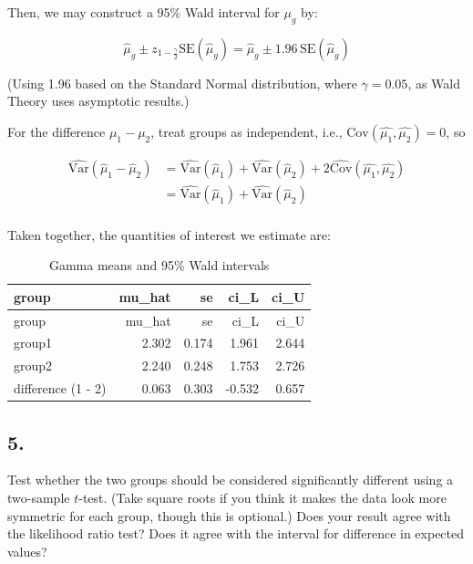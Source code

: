 \documentclass[
]{article}
\begin{document}
Then, we may construct a 95\% Wald interval for \(\mu_g\) by:

\[
\hat\mu_g \pm z_{1 - \frac{\gamma}{2}} \mathrm{SE}(\hat\mu_g)
= \hat\mu_g \pm 1.96\,\mathrm{SE}(\hat\mu_g)
\]

(Using 1.96 based on the Standard Normal distribution, where
\(\gamma = 0.05\), as Wald Theory uses asymptotic results.)

\newpage

For the difference \(\mu_1-\mu_2\), treat groups as independent, i.e.,
\(\mathrm{Cov}(\hat{\mu_1}, \hat{\mu_2}) = 0\), so

\[
\begin{aligned}
\widehat{\mathrm{Var}}(\hat\mu_1-\hat\mu_2)
&= \widehat{\mathrm{Var}}(\hat\mu_1)+\widehat{\mathrm{Var}}(\hat\mu_2) + 2\widehat{\mathrm{Cov}}(\hat{\mu_1}, \hat{\mu_2})\\
&= \widehat{\mathrm{Var}}(\hat\mu_1)+\widehat{\mathrm{Var}}(\hat\mu_2) \\ 
\end{aligned}
\]

Taken together, the quantities of interest we estimate are:

\begin{longtable}[]{@{}lrrrr@{}}
\caption{Gamma means and 95\% Wald intervals}\tabularnewline
\toprule\noalign{}
group & mu\_hat & se & ci\_L & ci\_U \\
\midrule\noalign{}
\endfirsthead
\toprule\noalign{}
group & mu\_hat & se & ci\_L & ci\_U \\
\midrule\noalign{}
\endhead
\bottomrule\noalign{}
\endlastfoot
group1 & 2.302 & 0.174 & 1.961 & 2.644 \\
group2 & 2.240 & 0.248 & 1.753 & 2.726 \\
difference (1 - 2) & 0.063 & 0.303 & -0.532 & 0.657 \\
\end{longtable}

\newpage

\subsection{5.}\label{section-4}

Test whether the two groups should be considered significantly different
using a two-sample \(t\)-test. (Take square roots if you think it makes
the data look more symmetric for each group, though this is optional.)
Does your result agree with the likelihood ratio test? Does it agree
with the interval for difference in expected values?
\end{document}
